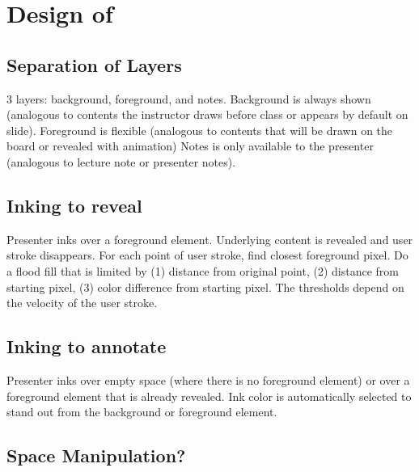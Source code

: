 \section{Design of \interface}




\subsection{Separation of Layers}
3 layers: background, foreground, and notes.
Background is always shown (analogous to contents the instructor draws before class or appears by default on slide).
Foreground is flexible (analogous to contents that will be drawn on the board or revealed with animation) 
Notes is only available to the presenter (analogous to lecture note or presenter notes). 

\subsection{Inking to reveal}
Presenter inks over a foreground element. Underlying content is revealed and user stroke disappears.
For each point of user stroke, find closest foreground pixel. Do a flood fill that is limited by (1) distance from original point, (2) distance from starting pixel, (3) color difference from starting pixel. The thresholds depend on the velocity of the user stroke. 

\subsection{Inking to annotate}
Presenter inks over empty space (where there is no foreground element) or over a foreground element that is already revealed. Ink color is automatically selected to stand out from the background or foreground element.

\subsection{Space Manipulation?}
